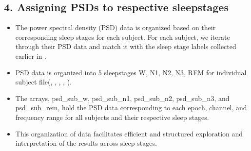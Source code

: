 \documentclass[letterpaper,10pt,english]{sphinxmanual}
\begin{document}
\subsection{4. Assigning PSDs to respective sleepstages}
\label{\detokenize{code:assigning-psds-to-respective-sleepstages}}\begin{itemize}
\item {} 
\sphinxAtStartPar
The power spectral density (PSD) data is organized based on their corresponding sleep stages for each subject. For each subject, we iterate through their PSD data and match it with the sleep stage labels collected earlier in .

\item {} 
\sphinxAtStartPar
PSD data is organized into 5 sleepstages\sphinxhyphen{} W, N1, N2, N3, REM for individual subject file(, , , , ).

\item {} 
\sphinxAtStartPar
The arrays, psd\_sub\_w, psd\_sub\_n1, psd\_sub\_n2, psd\_sub\_n3, and psd\_sub\_rem, hold the PSD data corresponding to each epoch, channel, and frequency range for all subjects and their respective sleep stages.

\item {} 
\sphinxAtStartPar
This organization of data facilitates efficient and structured exploration and interpretation of the results across sleep stages.

\end{itemize}
\end{document}
